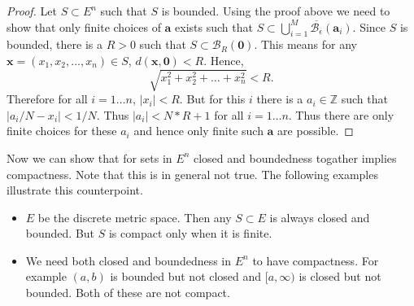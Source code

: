 \begin{proof}
    Let $S \subset E^n$ such that $S$ is bounded. Using the proof above we need to show that 
    only finite choices of $\mathbf{a}$ exists such that $S \subset \bigcup_{i = 1}^M
    \overline{\mathcal{B}_{\epsilon}}(\mathbf{a}_i)$. Since $S$ is bounded, there is a $R > 0$ such
    that $S \subset \mathcal{B}_{R}(\mathbf{0})$. This means for any $\mathbf{x} =
    \left(x_1,x_2,\dots,x_n\right) \in S$, $d(\mathbf{x},\mathbf{0}) < R$. Hence, \[\sqrt{x_1^2 +
	    x_2^2 + \dots + x_n^2} < R .\] Therefore for all $i = 1 \dots n$, $\lvert x_i \rvert <
    R$. But for this $i$ there is a $a_i \in \mathbb{Z}$ such that $\lvert a_i/N - x_i \rvert <
    1/N$. Thus $\lvert a_i \rvert < N*R + 1$ for all $i = 1 \dots n$. Thus there are only finite 
    choices for these $a_i$ and hence only finite such $\mathbf{a}$ are possible. 
      
\end{proof}

Now we can show that for sets in $E^n$ closed and boundedness togather implies compactness. Note
that this is in general not true. The following examples illustrate this counterpoint.
\begin{itemize}
    \item
	$E$ be the discrete metric space. Then any $S \subset E$ is always closed and bounded. But
	$S$ is compact only when it is finite.
    \item We need both closed and boundedness in $E^n$ to have compactness. For example $(a,b)$ is
	bounded but not closed and $[a,\infty)$ is closed but not bounded. Both of these are not
	compact. 	
\end{itemize}

